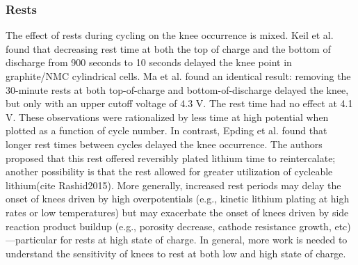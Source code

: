 \documentclass[journal=jpclcd,manuscript=article]{achemso}
\begin{document}
\subsubsection{Rests}

The effect of rests during cycling on the knee occurrence is mixed. 
Keil et al.\cite{keil_linear_2019} found that decreasing rest time at both the top of charge and the bottom of discharge from 900 seconds to 10 seconds delayed the knee point in graphite/NMC cylindrical cells.
Ma et al.\cite{ma_editors_2019} found an identical result: removing the 30-minute rests at both top-of-charge and bottom-of-discharge delayed the knee, but only with an upper cutoff voltage of 4.3 V. The rest time had no effect at 4.1 V.
These observations were rationalized by less time at high potential when plotted as a function of cycle number.
In contrast, Epding et al.\cite{epding_investigation_2019} found that longer rest times between cycles delayed the knee occurrence. The authors proposed that this rest offered reversibly plated lithium time to reintercalate; another possibility is that the rest allowed for greater utilization of cycleable lithium(cite Rashid2015). More generally, increased rest periods may delay the onset of knees driven by high overpotentials (e.g., kinetic lithium plating at high rates or low temperatures) but may exacerbate the onset of knees driven by side reaction product buildup (e.g., porosity decrease, cathode resistance growth, etc)---particular for rests at high state of charge. In general, more work is needed to understand the sensitivity of knees to rest at both low and high state of charge.
\end{document}

